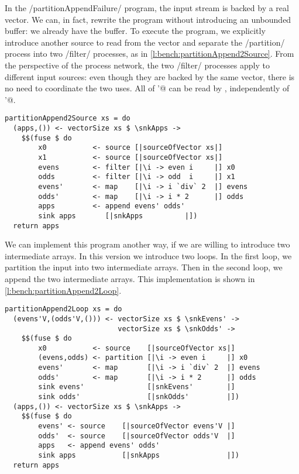 In the \Hs/partitionAppendFailure/ program, the input stream is backed by a real vector.
We can, in fact, rewrite the program without introducing an unbounded buffer: we already have the buffer.
To execute the program, we explicitly introduce another source to read from the vector and separate the \Hs/partition/ process into two \Hs/filter/ processes, as in \cref{l:bench:partitionAppend2Source}.
From the perspective of the process network, the two \Hs/filter/ processes apply to different input sources: even though they are backed by the same vector, there is no need to coordinate the two uses.
All of \Hs@evens'@ can be read by \Hs@append@, independently of \Hs@odds'@.

\begin{lstlisting}[float,label=l:bench:partitionAppend2Source,caption=Partition / append with two sources]
partitionAppend2Source xs = do
  (apps,()) <- vectorSize xs $ \snkApps ->
    $$(fuse $ do
        x0           <- source [|sourceOfVector xs|]
        x1           <- source [|sourceOfVector xs|]
        evens        <- filter [|\i -> even i     |] x0
        odds         <- filter [|\i -> odd  i     |] x1
        evens'       <- map    [|\i -> i `div` 2  |] evens
        odds'        <- map    [|\i -> i * 2      |] odds
        apps         <- append evens' odds'
        sink apps       [|snkApps          |])
  return apps
\end{lstlisting}

We can implement this program another way, if we are willing to introduce two intermediate arrays.
In this version we introduce two loops.
In the first loop, we partition the input into two intermediate arrays.
Then in the second loop, we append the two intermediate arrays.
This implementation is shown in \cref{l:bench:partitionAppend2Loop}.

\begin{lstlisting}[float,label=l:bench:partitionAppend2Loop,caption=Partition / append with two loops]
partitionAppend2Loop xs = do
  (evens'V,(odds'V,())) <- vectorSize xs $ \snkEvens' ->
                           vectorSize xs $ \snkOdds' ->
    $$(fuse $ do
        x0           <- source    [|sourceOfVector xs|]
        (evens,odds) <- partition [|\i -> even i     |] x0
        evens'       <- map       [|\i -> i `div` 2  |] evens
        odds'        <- map       [|\i -> i * 2      |] odds
        sink evens'               [|snkEvens'        |]
        sink odds'                [|snkOdds'         |])
  (apps,()) <- vectorSize xs $ \snkApps ->
    $$(fuse $ do
        evens' <- source    [|sourceOfVector evens'V |]
        odds'  <- source    [|sourceOfVector odds'V  |]
        apps   <- append evens' odds'
        sink apps           [|snkApps                |])
  return apps
\end{lstlisting}

